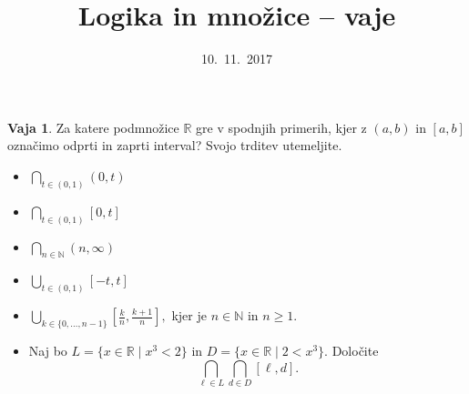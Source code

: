 \documentclass{article}
\newcommand{\NN}{\mathbb{N}}
\newcommand{\RR}{\mathbb{R}}
\theoremstyle{definition}
\newtheorem{vaja}{Vaja}
\begin{document}
\title{Logika in množice -- vaje}
\date{10.~11.~2017}
\maketitle

\begin{vaja}
  Za katere podmnožice $\RR$ gre v spodnjih primerih, kjer z $(a, b)$ in $[a, b]$ označimo odprti
  in zaprti interval? Svojo trditev utemeljite.
  \begin{itemize}
    \item
      $\displaystyle \bigcap_{t \in (0, 1)} (0, t)$
    \item
      $\displaystyle \bigcap_{t \in (0, 1)} [0, t]$
    \item
      $\displaystyle \bigcap_{n \in \NN} (n, \infty)$
    \item
      $\displaystyle \bigcup_{t \in (0, 1)} [-t, t]$
    \item
      $\displaystyle \bigcup_{k \in \{0, \ldots, n-1\}} [\frac{k}{n}, \frac{k+1}{n}],$
      kjer je $n \in \NN$ in $n \geq 1$.
    \item
      Naj bo $L = \{x \in \RR \mid x^3 < 2\}$ in $D = \{x \in \RR \mid 2 < x^3\}$.
      Določite $$\bigcap_{\ell \in L} \bigcap_{d \in D} [\ell, d].$$
  \end{itemize}
\end{vaja}

\newpage
\end{document}
